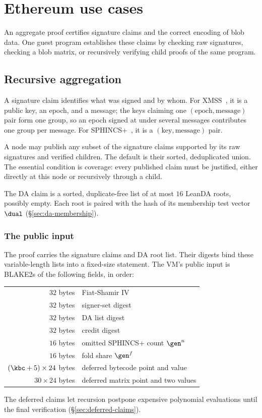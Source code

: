 \section{Ethereum use cases}\label{sec:ethereum}

An aggregate proof certifies signature claims and the correct encoding of blob data. One guest program establishes these claims by checking raw signatures, checking a blob matrix, or recursively verifying child proofs of the same program.

\subsection{Recursive aggregation}\label{sec:recursion}\label{sec:xmss-agg}\label{sec:sphincs-agg}

A signature claim identifies what was signed and by whom. For XMSS~\cite{rfc8391}, it is a public key, an epoch, and a message; the keys claiming one $(\text{epoch},\text{message})$ pair form one group, so an epoch signed at under several messages contributes one group per message. For SPHINCS+~\cite{sphincs}, it is a $(\text{key},\text{message})$ pair.

A node may publish any subset of the signature claims supported by its raw signatures and verified children. The default is their sorted, deduplicated union. The essential condition is coverage: every published claim must be justified, either directly at this node or recursively through a child.

The DA claim is a sorted, duplicate-free list of at most $16$ LeanDA roots, possibly empty. Each root is paired with the hash of its membership test vector $\dual$ (\S\ref{sec:da-membership}). 

\subsubsection{The public input}\label{sec:rec-stmt}

The proof carries the signature claims and DA root list. Their digests bind these variable-length lists into a fixed-size statement. The VM's public input is BLAKE2s of the following fields, in order:
\begin{center}
\begin{tabular}{@{}rl@{}}
\hline
$32$ bytes & Fiat-Shamir IV\\
$32$ bytes & signer-set digest\\
$32$ bytes & DA list digest\\
$32$ bytes & credit digest\\
$16$ bytes & omitted SPHINCS+ count $\gen^n$\\
$16$ bytes & fold share $\gen^f$\\
$(\kbc+5)\times24$ bytes & deferred bytecode point and value\\
$30\times24$ bytes & deferred matrix point and two values\\
\hline
\end{tabular}
\end{center}
The deferred claims let recursion postpone expensive polynomial evaluations until the final verification (\S\ref{sec:deferred-claims}).

